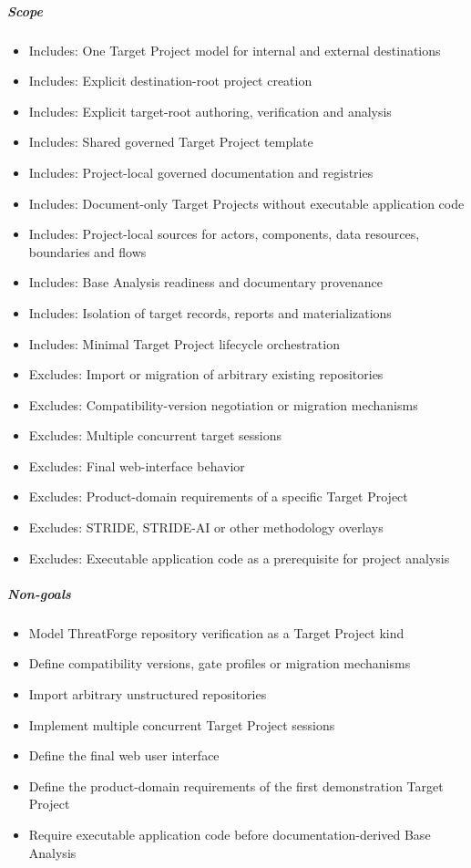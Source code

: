 \documentclass[
  10pt,
]{article}
\providecommand{\tightlist}{%
  \setlength{\itemsep}{0pt}\setlength{\parskip}{0pt}}
\begin{document}
\subparagraph{Scope}\label{scope-4}

\begin{itemize}
\tightlist
\item
  Includes: One Target Project model for internal and external
  destinations
\item
  Includes: Explicit destination-root project creation
\item
  Includes: Explicit target-root authoring, verification and analysis
\item
  Includes: Shared governed Target Project template
\item
  Includes: Project-local governed documentation and registries
\item
  Includes: Document-only Target Projects without executable application
  code
\item
  Includes: Project-local sources for actors, components, data
  resources, boundaries and flows
\item
  Includes: Base Analysis readiness and documentary provenance
\item
  Includes: Isolation of target records, reports and materializations
\item
  Includes: Minimal Target Project lifecycle orchestration
\item
  Excludes: Import or migration of arbitrary existing repositories
\item
  Excludes: Compatibility-version negotiation or migration mechanisms
\item
  Excludes: Multiple concurrent target sessions
\item
  Excludes: Final web-interface behavior
\item
  Excludes: Product-domain requirements of a specific Target Project
\item
  Excludes: STRIDE, STRIDE-AI or other methodology overlays
\item
  Excludes: Executable application code as a prerequisite for project
  analysis
\end{itemize}

\subparagraph{Non-goals}\label{non-goals-3}

\begin{itemize}
\tightlist
\item
  Model ThreatForge repository verification as a Target Project kind
\item
  Define compatibility versions, gate profiles or migration mechanisms
\item
  Import arbitrary unstructured repositories
\item
  Implement multiple concurrent Target Project sessions
\item
  Define the final web user interface
\item
  Define the product-domain requirements of the first demonstration
  Target Project
\item
  Require executable application code before documentation-derived Base
  Analysis
\end{itemize}
\end{document}
